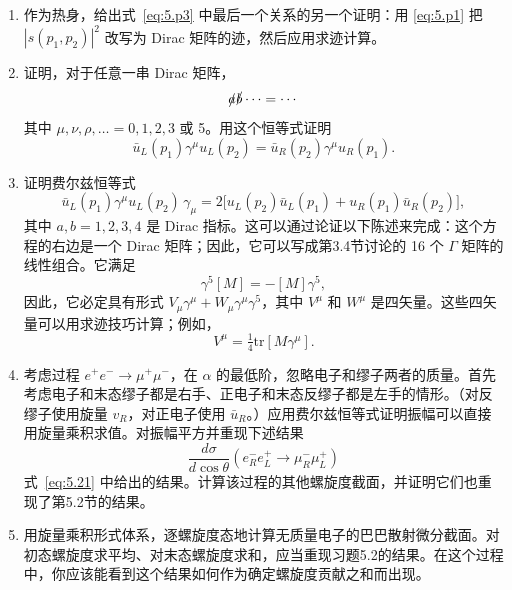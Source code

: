 \begin{enumerate}[label=(\alph*)]
  \item 作为热身，给出式~\eqref{eq:5.p3} 中最后一个关系的另一个证明：用 \eqref{eq:5.p1} 把 $|s(p_1,p_2)|^2$ 改写为 Dirac 矩阵的迹，然后应用求迹计算。
  \item 证明，对于任意一串 Dirac 矩阵，
    \begin{equation}
      \slashed{a}\slashed{b}\cdots = \cdots
    \end{equation}
    其中 $\mu, \nu, \rho, \ldots = 0, 1, 2, 3$ 或 5。用这个恒等式证明
    \begin{equation}
      \bar{u}_L(p_1)\gamma^\mu u_L(p_2)
        = \bar{u}_R(p_2)\gamma^\mu u_R(p_1) .
    \end{equation}
  \item 证明费尔兹恒等式
    \begin{equation}
      \bar{u}_L(p_1)\gamma^\mu u_L(p_2)\,\gamma_\mu = 2\bigl[
        u_L(p_2)\bar{u}_L(p_1) + u_R(p_1)\bar{u}_R(p_2) \bigr],
    \end{equation}
    其中 $a, b = 1, 2, 3, 4$ 是 Dirac 指标。这可以通过论证以下陈述来完成：这个方程的右边是一个 Dirac 矩阵；因此，它可以写成第3.4节讨论的 16 个 $\Gamma$ 矩阵的线性组合。它满足
    \begin{equation}
      \gamma^5[M] = -[M]\gamma^5,
    \end{equation}
    因此，它必定具有形式 $V_\mu\gamma^\mu + W_\mu\gamma^\mu\gamma^5$，其中 $V^\mu$ 和 $W^\mu$ 是四矢量。这些四矢量可以用求迹技巧计算；例如，
    \begin{equation}
      V^\mu = \tfrac{1}{4}\mathrm{tr}[M\gamma^\mu] .
    \end{equation}
  \item 考虑过程 $e^{+}e^{-}\to\mu^{+}\mu^{-}$，在 $\alpha$ 的最低阶，忽略电子和缪子两者的质量。首先考虑电子和末态缪子都是右手、正电子和末态反缪子都是左手的情形。（对反缪子使用旋量 $v_R$，对正电子使用 $\bar{u}_R$。）应用费尔兹恒等式证明振幅可以直接用旋量乘积求值。对振幅平方并重现下述结果
    \begin{equation}
      \frac{d\sigma}{d\cos\theta}(e^{-}_R e^{+}_L \to \mu^{-}_R\mu^{+}_L)
    \end{equation}
    式~\eqref{eq:5.21} 中给出的结果。计算该过程的其他螺旋度截面，并证明它们也重现了第5.2节的结果。
  \item 用旋量乘积形式体系，逐螺旋度态地计算无质量电子的巴巴散射微分截面。对初态螺旋度求平均、对末态螺旋度求和，应当重现习题5.2的结果。在这个过程中，你应该能看到这个结果如何作为确定螺旋度贡献之和而出现。
\end{enumerate}

